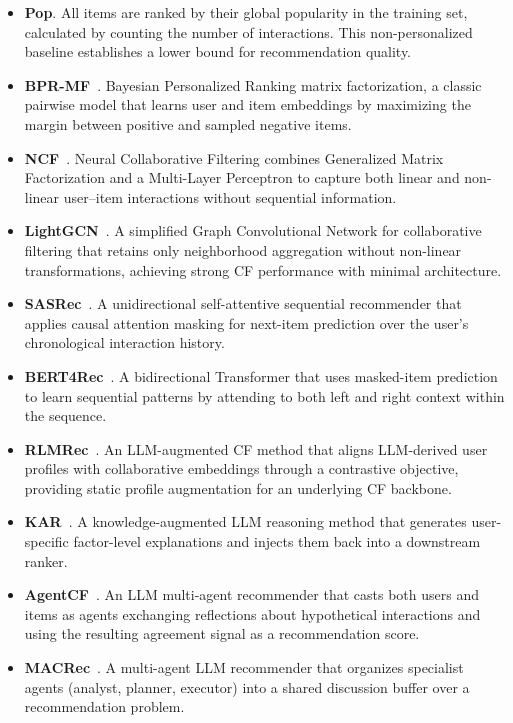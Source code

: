 \documentclass[master,english,final]{postech-ucs}
\begin{document}
\begin{itemize}
    \item \textbf{Pop}. All items are ranked by their global popularity in the training set, calculated by counting the number of interactions. This non-personalized baseline establishes a lower bound for recommendation quality.
    \item \textbf{BPR-MF}~\cite{rendle2009bpr}. Bayesian Personalized Ranking matrix factorization, a classic pairwise model that learns user and item embeddings by maximizing the margin between positive and sampled negative items.
    \item \textbf{NCF}~\cite{he2017neural}. Neural Collaborative Filtering combines Generalized Matrix Factorization and a Multi-Layer Perceptron to capture both linear and non-linear user--item interactions without sequential information.
    \item \textbf{LightGCN}~\cite{he2020lightgcn}. A simplified Graph Convolutional Network for collaborative filtering that retains only neighborhood aggregation without non-linear transformations, achieving strong CF performance with minimal architecture.
    \item \textbf{SASRec}~\cite{kang2018self}. A unidirectional self-attentive sequential recommender that applies causal attention masking for next-item prediction over the user's chronological interaction history.
    \item \textbf{BERT4Rec}~\cite{sun2019bert4rec}. A bidirectional Transformer that uses masked-item prediction to learn sequential patterns by attending to both left and right context within the sequence.
    \item \textbf{RLMRec}~\cite{ren2024rlmrec}. An LLM-augmented CF method that aligns LLM-derived user profiles with collaborative embeddings through a contrastive objective, providing static profile augmentation for an underlying CF backbone.
    \item \textbf{KAR}~\cite{xi2024kar}. A knowledge-augmented LLM reasoning method that generates user-specific factor-level explanations and injects them back into a downstream ranker.
    \item \textbf{AgentCF}~\cite{zhang2024agentcf}. An LLM multi-agent recommender that casts both users and items as agents exchanging reflections about hypothetical interactions and using the resulting agreement signal as a recommendation score.
    \item \textbf{MACRec}~\cite{wang2024macrec}. A multi-agent LLM recommender that organizes specialist agents (analyst, planner, executor) into a shared discussion buffer over a recommendation problem.
\end{itemize}
\end{document}
